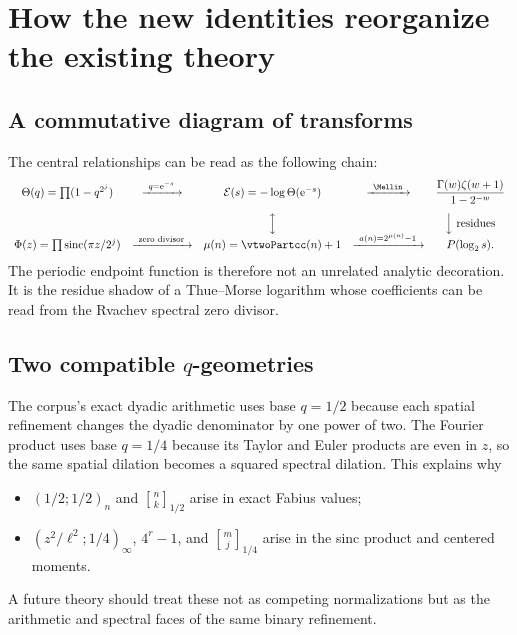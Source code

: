 \documentclass[11pt]{article}
\numberwithin{equation}{section}
\theoremstyle{definition}
\theoremstyle{remark}
\newcommand{\sinc}{\operatorname{sinc}}
\newcommand{\e}{\mathrm e}
\newcommand{\qbinom}[3]{\genfrac{[}{]}{0pt}{}{#1}{#2}_{#3}}
\begin{document}
\section{How the new identities reorganize the existing theory}

\subsection{A commutative diagram of transforms}
The central relationships can be read as the following chain:
\[
\begin{array}{ccccc}
 \Theta(q)=\prod(1-q^{2^j})
 &\xrightarrow{\ q=\e^{-s}\ }&
 \mathcal E(s)=-\log\Theta(\e^{-s})
 &\xrightarrow{\ \Mellin\ }&
 \dfrac{\Gamma(w)\zeta(w+1)}{1-2^{-w}}\\[1.2em]
 &&\Big\updownarrow&&\Big\downarrow\text{ residues}\\[-0.2em]
 \Phi(z)=\prod\sinc(\pi z/2^j)
 &\xrightarrow{\ \text{zero divisor}\ }&
 \mu(n)=\vtwoPartcc(n)+1
 &\xrightarrow{\ a(n)=2^{\mu(n)}-1\ }&
 P(\log_2s).
\end{array}
\]
The periodic endpoint function is therefore not an unrelated analytic decoration.  It is
the residue shadow of a Thue--Morse logarithm whose coefficients can be read from the
Rvachev spectral zero divisor.

\subsection{Two compatible $q$-geometries}
The corpus's exact dyadic arithmetic uses base $q=1/2$ because each spatial refinement
changes the dyadic denominator by one power of two.  The Fourier product uses base
$q=1/4$ because its Taylor and Euler products are even in $z$, so the same spatial
dilation becomes a squared spectral dilation.  This explains why
\begin{itemize}
\item $(1/2;1/2)_n$ and $\qbinom nk{1/2}$ arise in exact Fabius values;
\item $(z^2/\ell^2;1/4)_\infty$, $4^r-1$, and
$\qbinom mj{1/4}$ arise in the sinc product and centered moments.
\end{itemize}
A future theory should treat these not as competing normalizations but as the arithmetic
and spectral faces of the same binary refinement.
\end{document}
